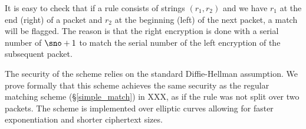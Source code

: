  It is easy to check that if a rule consists of strings $(r_1, r_2)$ and we have $r_1$ at the end (right) of a packet and $r_2$ at the beginning (left) of the next packet, a match will be flagged. 
 The reason is that the right encryption is done with a serial number of $\sno +1$ to match the serial number of the left encryption of the subsequent packet. 
 
The security of the scheme relies on the standard Diffie-Hellman assumption. We prove formally that this scheme achieves the same security as the regular matching scheme (\S\ref{simple_match}) in XXX, as if the rule was not split over two packets. The scheme is implemented over elliptic curves allowing for faster exponentiation and shorter ciphertext sizes. 